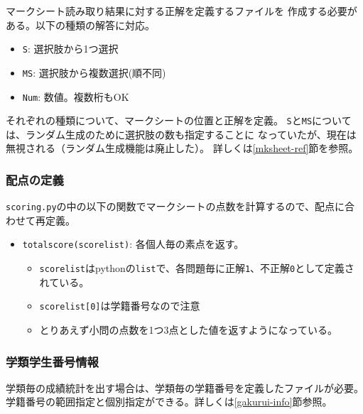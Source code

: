 マークシート読み取り結果に対する正解を定義するファイルを
作成する必要がある。以下の種類の解答に対応。

\begin{itemize}
\item \texttt{S}: 選択肢から1つ選択

\item \texttt{MS}: 選択肢から複数選択(順不同)

\item \texttt{Num}: 数値。複数桁もOK

\end{itemize}
それぞれの種類について、マークシートの位置と正解を定義。
\texttt{S}と\texttt{MS}については、ランダム生成のために選択肢の数も指定することに
なっていたが、現在は無視される（ランダム生成機能は廃止した）。
詳しくは\ref{mksheet-ref}節を参照。

\subsubsection{配点の定義}
\label{配点の定義}

\texttt{scoring.py}の中の以下の関数でマークシートの点数を計算するので、配点に合わせて再定義。

\begin{itemize}
\item \texttt{totalscore(scorelist)}: 各個人毎の素点を返す。

\begin{itemize}
\item \texttt{scorelist}はpythonの\texttt{list}で、各問題毎に正解\texttt{1}、不正解\texttt{0}として定義されている。

\item \texttt{scorelist[0]}は学籍番号なので注意

\item とりあえず小問の点数を1つ3点とした値を返すようになっている。

\end{itemize}

\end{itemize}

\subsubsection{学類学生番号情報}
\label{学類学生番号情報}

学類毎の成績統計を出す場合は、学類毎の学籍番号を定義したファイルが必要。
学籍番号の範囲指定と個別指定ができる。詳しくは\ref{gakurui-info}節参照。

